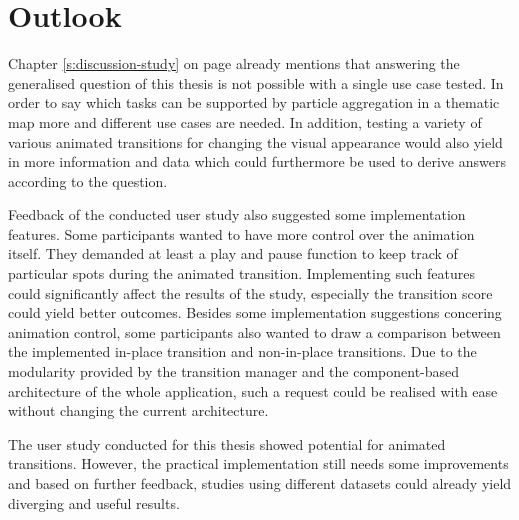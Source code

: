 \section{Outlook}
\label{s:outlook}
Chapter \ref{s:discussion-study} on page \pageref{s:discussion-study} already mentions that answering the generalised question of this thesis is not possible with a single use case tested. In order to say which tasks can be supported by particle aggregation in a thematic map more and different use cases are needed. In addition, testing a variety of various animated transitions for changing the visual appearance would also yield in more information and data which could furthermore be used to derive answers according to the question.

Feedback of the conducted user study also suggested some implementation features. Some participants wanted to have more control over the animation itself. They demanded at least a play and pause function to keep track of particular spots during the animated transition. Implementing such features could significantly affect the results of the study, especially the transition score could yield better outcomes. Besides some implementation suggestions concering animation control, some participants also wanted to draw a comparison between the implemented in-place transition and non-in-place transitions. Due to the modularity provided by the transition manager and the component-based architecture of the whole application, such a request could be realised with ease without changing the current architecture.

The user study conducted for this thesis showed potential for animated transitions. However, the practical implementation still needs some improvements and based on further feedback, studies using different datasets could already yield diverging and useful results.
